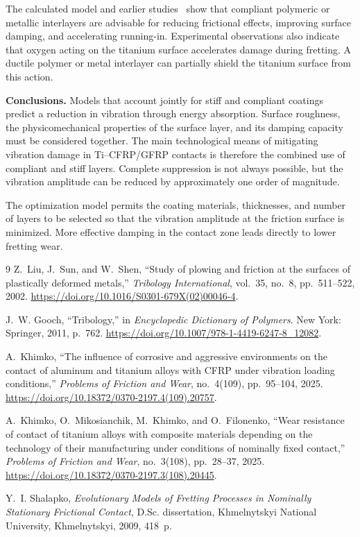 The calculated model and earlier studies~\cite{khimko:gooch2011,khimko:2025env,khimko:2025wear,khimko:shalapko2009} show that compliant polymeric or metallic interlayers are advisable for reducing frictional effects, improving surface damping, and accelerating running-in. Experimental observations also indicate that oxygen acting on the titanium surface accelerates damage during fretting. A ductile polymer or metal interlayer can partially shield the titanium surface from this action.

\textbf{Conclusions.} Models that account jointly for stiff and compliant coatings predict a reduction in vibration through energy absorption. Surface roughness, the physicomechanical properties of the surface layer, and its damping capacity must be considered together. The main technological means of mitigating vibration damage in Ti--CFRP/GFRP contacts is therefore the combined use of compliant and stiff layers. Complete suppression is not always possible, but the vibration amplitude can be reduced by approximately one order of magnitude.

The optimization model permits the coating materials, thicknesses, and number of layers to be selected so that the vibration amplitude at the friction surface is minimized. More effective damping in the contact zone leads directly to lower fretting wear.

\renewcommand{\refname}{References}
\begin{thebibliography}{9}
Z.~Liu, J.~Sun, and W.~Shen,
``Study of plowing and friction at the surfaces of plastically deformed metals,''
\emph{Tribology International}, vol.~35, no.~8, pp.~511--522, 2002.
\url{https://doi.org/10.1016/S0301-679X(02)00046-4}.

J.~W. Gooch, ``Tribology,'' in \emph{Encyclopedic Dictionary of Polymers}.
New York: Springer, 2011, p.~762.
\url{https://doi.org/10.1007/978-1-4419-6247-8_12082}.

A.~Khimko,
``The influence of corrosive and aggressive environments on the contact of aluminum and titanium alloys with CFRP under vibration loading conditions,''
\emph{Problems of Friction and Wear}, no.~4(109), pp.~95--104, 2025.
\url{https://doi.org/10.18372/0370-2197.4(109).20757}.

A.~Khimko, O.~Mikosianchik, M.~Khimko, and O.~Filonenko,
``Wear resistance of contact of titanium alloys with composite materials depending on the technology of their manufacturing under conditions of nominally fixed contact,''
\emph{Problems of Friction and Wear}, no.~3(108), pp.~28--37, 2025.
\url{https://doi.org/10.18372/0370-2197.3(108).20445}.

Y.~I. Shalapko,
\emph{Evolutionary Models of Fretting Processes in Nominally Stationary Frictional Contact}, D.Sc. dissertation, Khmelnytskyi National University, Khmelnytskyi, 2009, 418~p.
\end{thebibliography}
